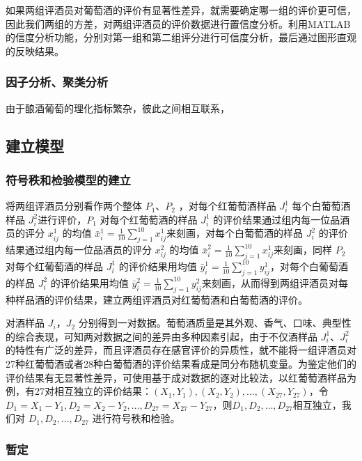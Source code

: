 \documentclass[nocover]{cumcmart}%
\begin{document}
        如果两组评酒员对葡萄酒的评价有显著性差异，就需要确定哪一组的评价更可信，因此我们两组的方差，对两组评酒员的评价数据进行置信度分析。利用MATLAB的信度分析功能，分别对第一组和第二组评分进行可信度分析，最后通过图形直观的反映结果。

        \subsubsection{因子分析、聚类分析}
        由于酿酒葡萄的理化指标繁杂，彼此之间相互联系，

    \subsection{建立模型}

        \subsubsection{符号秩和检验模型的建立}
    将两组评酒员分别看作两个整体 ${P_1}$、${P_2}$ ，对每个红葡萄酒样品 ${J_{i}^{1}}$ 每个白葡萄酒样品 ${J_{i}^{2}}$进行评价，${P_1}$ 对每个红葡萄酒的样品 ${J_{i}^{1}}$ 的评价结果通过组内每一位品酒员的评分 ${x_{ij}^{1}}$ 的均值 $\bar{x}_{i}^1 = \frac{1}{10}\sum\limits_{j=1}^{10}x_{ij}^{1}$来刻画，对每个白葡萄酒的样品 ${J_{i}^{2}}$ 的评价结果通过组内每一位品酒员的评分 ${x_{ij}^{2}}$ 的均值 ${\bar{x}_{i}^{2}} = \frac{1}{10}\sum\limits_{j=1}^{10}x_{ij}^{1}$来刻画，同样 ${P_2}$ 对每个红葡萄酒的样品 ${J_{i}^{1}}$ 的评价结果用均值 ${\bar{y}_{i}^{1}} = \frac{1}{10}\sum\limits_{j=1}^{10}y_{ij}^{1}$，对每个白葡萄酒的样品 ${J_{i}^{2}}$ 的评价结果用均值 ${\bar{y}_{i}^{2}} = \frac{1}{10}\sum\limits_{j=1}^{10}y_{ij}^{2}$来刻画，从而得到两组评酒员对每种样品酒的评价结果，建立两组评酒员对红葡萄酒和白葡萄酒的评价。

    对酒样品 ${J_i}$，${J_2}$ 分别得到一对数据。葡萄酒质量是其外观、香气、口味、典型性的综合表现\cite{1}，可知两对数据之间的差异由多种因素引起，由于不仅酒样品 ${J_{i}^{1}}$、${J_{i}^{2}}$ 的特性有广泛的差异，而且评酒员存在感官评价的异质性\cite{2}，就不能将一组评酒员对27种红葡萄酒或者28种白葡萄酒的评价结果看成是同分布随机变量。为鉴定他们的评价结果有无显著性差异，可使用基于成对数据的逐对比较法，以红葡萄酒样品为例，有27对相互独立的评价结果：${(X_1,Y_1),(X_2,Y_2),\ldots,(X_{27},Y_{27})}$，令${D_1 = X_1 - Y_1,D_2 = X_2 - Y_2,\ldots,D_{27} = X_{27} - Y_{27}}$，则${D_1,D_2,\ldots,D_{27}}$相互独立，我们对 ${D_1,D_2,\ldots,D_{27}}$ 进行符号秩和检验。


        \subsubsection{暂定}
\end{document}
